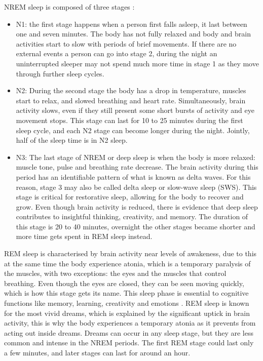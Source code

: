 NREM sleep is composed of three stages \cite{StagesFoundation}:
\begin{itemize}
    \item N1: the first stage happens when a person first falls asleep, it last between one and seven minutes. The body has not fully relaxed and body and brain activities start to slow with periods of brief movements. If there are no external events a person can go into stage 2, during the night an uninterrupted sleeper may not spend much more time in stage 1 as they move through further sleep cycles.
    \item N2: During the second stage the body has a drop in temperature,  muscles start to relax, and slowed breathing and heart rate. Simultaneously, brain activity slows, even if they still present some short bursts of activity and eye movement stops. This stage can last for 10 to 25 minutes during the first sleep cycle, and each N2 stage can become longer during the night. Jointly, half of the sleep time is in N2 sleep.
    \item N3: The last stage of NREM or deep sleep is when the body is more relaxed: muscle tone, pulse and breathing rate decrease.
    The brain activity during this period has an identifiable pattern of what is known as delta waves. For this reason, stage 3 may also be called delta sleep or slow-wave sleep (SWS). This stage is critical for restorative sleep, allowing for the body to recover and grow. Even though brain activity is reduced, there is evidence that deep sleep contributes to insightful thinking, creativity, and memory\cite{Yordanova2010DifferentialRegularity}. The duration of this stage is 20 to 40 minutes, overnight the other stages became shorter and more time gets spent in REM sleep instead.
\end{itemize}

REM sleep is characterised by brain activity near levels of awakeness, due to this at the same time the body experience atonia, which is a temporary paralysis of the muscles, with two exceptions: the eyes and the muscles that control breathing. Even though the eyes are closed, they can be seen moving quickly, which is how this stage gets its name.
This sleep phase is essential to cognitive functions like memory, learning, creativity and emotions \cite{Baran2012ProcessingSleep}.
REM sleep is known for the most vivid dreams, which is explained by the significant uptick in brain activity, this is why the body experiences a temporary atonia as it prevents from acting out inside dreams. Dreams can occur in any sleep stage, but they are less common and intense in the NREM periods. The first REM stage could last only a few minutes, and later stages can last for around an hour.


